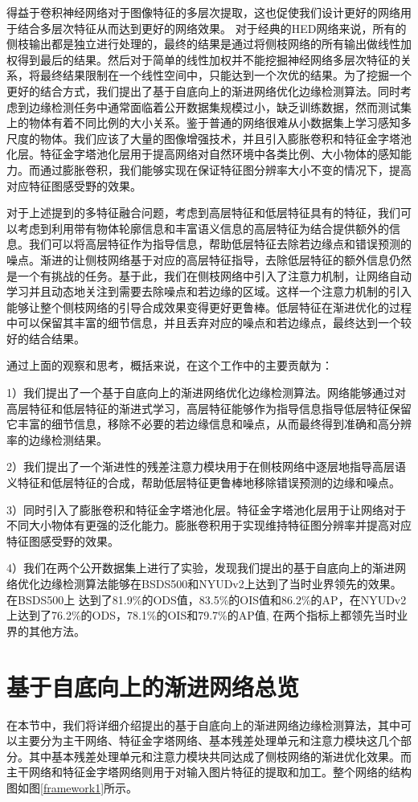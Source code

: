 \documentclass[master]{thesis-uestc}
\begin{document}
得益于卷积神经网络对于图像特征的多层次提取，这也促使我们设计更好的网络用于结合多层次特征从而达到更好的网络效果。 对于经典的HED网络来说，所有的侧枝输出都是独立进行处理的，最终的结果是通过将侧枝网络的所有输出做线性加权得到最后的结果。然后对于简单的线性加权并不能挖掘神经网络多层次特征的关系，将最终结果限制在一个线性空间中，只能达到一个次优的结果。为了挖掘一个更好的结合方式，我们提出了基于自底向上的渐进网络优化边缘检测算法。同时考虑到边缘检测任务中通常面临着公开数据集规模过小，缺乏训练数据，然而测试集上的物体有着不同比例的大小关系。鉴于普通的网络很难从小数据集上学习感知多尺度的物体。我们应该了大量的图像增强技术，并且引入膨胀卷积和特征金字塔池化层。特征金字塔池化层用于提高网络对自然环境中各类比例、大小物体的感知能力。而通过膨胀卷积，我们能够实现在保证特征图分辨率大小不变的情况下，提高对应特征图感受野的效果。

对于上述提到的多特征融合问题，考虑到高层特征和低层特征具有的特征，我们可以考虑到利用带有物体轮廓信息和丰富语义信息的高层特征为结合提供额外的信息。我们可以将高层特征作为指导信息，帮助低层特征去除若边缘点和错误预测的噪点。渐进的让侧枝网络基于对应的高层特征指导，去除低层特征的额外信息仍然是一个有挑战的任务。基于此，我们在侧枝网络中引入了注意力机制，让网络自动学习并且动态地关注到需要去除噪点和若边缘的区域。这样一个注意力机制的引入能够让整个侧枝网络的引导合成效果变得更好更鲁棒。低层特征在渐进优化的过程中可以保留其丰富的细节信息，并且丢弃对应的噪点和若边缘点，最终达到一个较好的结合结果。

通过上面的观察和思考，概括来说，在这个工作中的主要贡献为：

1）我们提出了一个基于自底向上的渐进网络优化边缘检测算法。网络能够通过对高层特征和低层特征的渐进式学习，高层特征能够作为指导信息指导低层特征保留它丰富的细节信息，移除不必要的若边缘信息和噪点，从而最终得到准确和高分辨率的边缘检测结果。

2）我们提出了一个渐进性的残差注意力模块用于在侧枝网络中逐层地指导高层语义特征和低层特征的合成，帮助低层特征更鲁棒地移除错误预测的边缘和噪点。

3）同时引入了膨胀卷积和特征金字塔池化层。特征金字塔池化层用于让网络对于不同大小物体有更强的泛化能力。膨胀卷积用于实现维持特征图分辨率并提高对应特征图感受野的效果。

4）我们在两个公开数据集上进行了实验，发现我们提出的基于自底向上的渐进网络优化边缘检测算法能够在BSDS500和NYUDv2上达到了当时业界领先的效果。在BSDS500上 达到了81.9\%的ODS值，83.5\%的OIS值和86.2\%的AP，在NYUDv2上达到了76.2\%的ODS，78.1\%的OIS和79.7\%的AP值, 在两个指标上都领先当时业界的其他方法。


\section{基于自底向上的渐进网络总览}
在本节中，我们将详细介绍提出的基于自底向上的渐进网络边缘检测算法，其中可以主要分为主干网络、特征金字塔网络、基本残差处理单元和注意力模块这几个部分。其中基本残差处理单元和注意力模块共同达成了侧枝网络的渐进优化效果。而主干网络和特征金字塔网络则用于对输入图片特征的提取和加工。整个网络的结构图如图\ref{framework1}所示。
\end{document}
